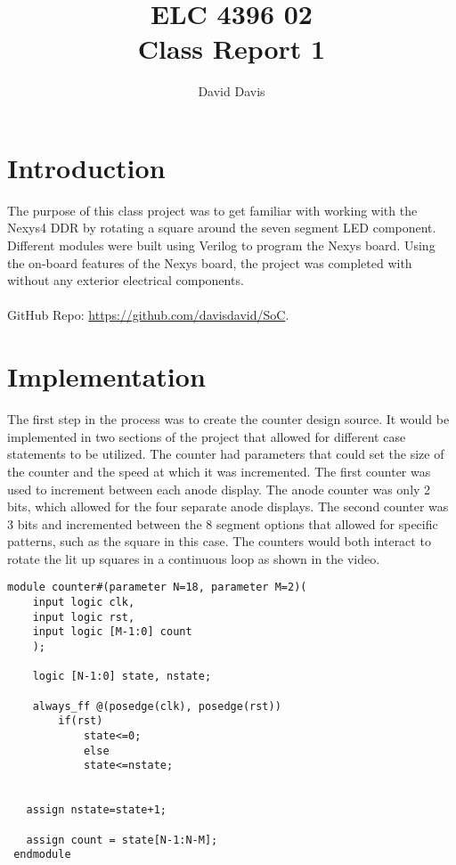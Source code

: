\documentclass[11pt]{article}
\begin{document}
\title{ELC 4396 02 \\ Class Report 1}
\author{David Davis}

\maketitle


\section*{Introduction} 

The purpose of this class project was to get familiar with working with the Nexys4 DDR by rotating a square around the seven segment LED component. Different modules were built using Verilog to program the Nexys board. Using the on-board features of the Nexys board, the project was completed with without any exterior electrical components.  \\\\GitHub Repo: \url{https://github.com/davisdavid/SoC}.


\section*{Implementation}

The first step in the process was to create the counter design source. It would be implemented in two sections of the project that allowed for different case statements to be utilized. The counter had parameters that could set the size of the counter and the speed at which it was incremented. The first counter was used to increment between each anode display. The anode counter was only 2 bits, which allowed for the four separate anode displays. The second counter was 3 bits and incremented between the 8 segment options that allowed for specific patterns, such as the square in this case. The counters would both interact to rotate the lit up squares in a continuous loop as shown in the video.  

\begin{lstlisting}[style=Verilog,caption=Counter Module ,label=code:ex ]
 module counter#(parameter N=18, parameter M=2)(
    input logic clk,
    input logic rst,
    input logic [M-1:0] count
    );
    
    logic [N-1:0] state, nstate;
    
    always_ff @(posedge(clk), posedge(rst))
        if(rst)
            state<=0;
            else
            state<=nstate;
           
       
   assign nstate=state+1;
   
   assign count = state[N-1:N-M]; 
 endmodule
\end{lstlisting}
\end{document}
